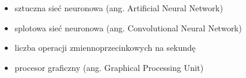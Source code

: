 \flushleft



\begin{itemize}[noitemsep,topsep=0pt,parsep=0pt,partopsep=0pt,labelwidth=3cm,align=left,leftmargin=4cm]
\item[ANN] sztuczna sieć neuronowa (ang. Artificial Neural Network)
    \item[CNN] splotowa sieć neuronowa (ang. Convolutional Neural Network)
    \item[FLOPS] liczba operacji zmiennoprzecinkowych na sekundę
    \item[GPU] procesor graficzny (ang. Graphical Processing Unit)
\end{itemize}

